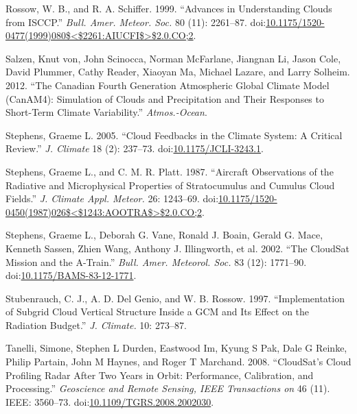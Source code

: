 \hypertarget{ref-rossowux5fandux5fschifferux5f1999}{}
Rossow, W. B., and R. A. Schiffer. 1999. ``Advances in Understanding
Clouds from ISCCP.'' \emph{Bull. Amer. Meteor. Soc.} 80 (11): 2261--87.
doi:\href{https://doi.org/10.1175/1520-0477(1999)080$\%3C$2261:AIUCFI$\%3E$2.0.CO;2}{10.1175/1520-0477(1999)080\$\textless{}\$2261:AIUCFI\$\textgreater{}\$2.0.CO;2}.

\hypertarget{ref-vonux5fsalzenux5fetux5falux5f2012}{}
Salzen, Knut von, John Scinocca, Norman McFarlane, Jiangnan Li, Jason
Cole, David Plummer, Cathy Reader, Xiaoyan Ma, Michael Lazare, and Larry
Solheim. 2012. ``The Canadian Fourth Generation Atmospheric Global
Climate Model (CanAM4): Simulation of Clouds and Precipitation and Their
Responses to Short-Term Climate Variability.'' \emph{Atmos.-Ocean}.

\hypertarget{ref-stephensux5f2005}{}
Stephens, Graeme L. 2005. ``Cloud Feedbacks in the Climate System: A
Critical Review.'' \emph{J. Climate} 18 (2): 237--73.
doi:\href{https://doi.org/10.1175/JCLI-3243.1}{10.1175/JCLI-3243.1}.

\hypertarget{ref-stephensux5fandux5fplattux5f1987}{}
Stephens, Graeme L., and C. M. R. Platt. 1987. ``Aircraft Observations
of the Radiative and Microphysical Properties of Stratocumulus and
Cumulus Cloud Fields.'' \emph{J. Climate Appl. Meteor.} 26: 1243--69.
doi:\href{https://doi.org/10.1175/1520-0450(1987)026$\%3C$1243:AOOTRA$\%3E$2.0.CO;2}{10.1175/1520-0450(1987)026\$\textless{}\$1243:AOOTRA\$\textgreater{}\$2.0.CO;2}.

\hypertarget{ref-stephensux5fetux5falux5f2002}{}
Stephens, Graeme L., Deborah G. Vane, Ronald J. Boain, Gerald G. Mace,
Kenneth Sassen, Zhien Wang, Anthony J. Illingworth, et al. 2002. ``The
CloudSat Mission and the A-Train.'' \emph{Bull. Amer. Meteorol. Soc.} 83
(12): 1771--90.
doi:\href{https://doi.org/10.1175/BAMS-83-12-1771}{10.1175/BAMS-83-12-1771}.

\hypertarget{ref-stubenrauchux5fetux5falux5f1997}{}
Stubenrauch, C. J., A. D. Del Genio, and W. B. Rossow. 1997.
``Implementation of Subgrid Cloud Vertical Structure Inside a GCM and
Its Effect on the Radiation Budget.'' \emph{J. Climate.} 10: 273--87.

\hypertarget{ref-tanelliux5fetux5falux5f2008}{}
Tanelli, Simone, Stephen L Durden, Eastwood Im, Kyung S Pak, Dale G
Reinke, Philip Partain, John M Haynes, and Roger T Marchand. 2008.
``CloudSat's Cloud Profiling Radar After Two Years in Orbit:
Performance, Calibration, and Processing.'' \emph{Geoscience and Remote
Sensing, IEEE Transactions on} 46 (11). IEEE: 3560--73.
doi:\href{https://doi.org/10.1109/TGRS.2008.2002030}{10.1109/TGRS.2008.2002030}.

